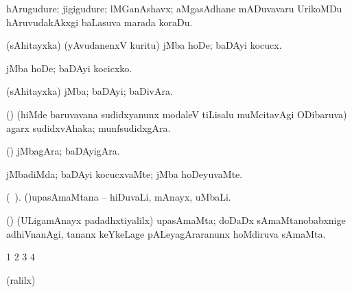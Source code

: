 \bentry
{} 
\gl{\nA}
\expl{}
\bmng
 hArugudure; jigigudure; lMGanAshavx; aMgasAdhane mADuvavaru UrikoMDu hAruvudakAkxgi baLasuva marada koraDu. 
\emng
\eentry

\bentry
{} 
\gl{\sakirx}
\expl{}
\bmng
 (sAhitayxka) (yAvudanenxV kuritu) jMba hoDe; baDAyi kocucx. 
\emng

\noindent 
\gl{\akirx}
\expl{}
\bmng
 jMba hoDe; baDAyi kocicxko. 
\emng
\eentry

\bentry
{} 
\gl{\nA}
\expl{}
\bmng
 (sAhitayxka) jMba; baDAyi; baDivAra. 
\emng
\eentry

\bentry
{} 
\gl{\nA}
\expl{}
\bmng
(\pArxparx) (hiMde baruvavana sudidxyanunx modaleV tiLisalu muMcitavAgi ODibaruva) agarx sudidxvAhaka; munfsudidxgAra. 
\emng
\eentry

\bentry
{} 
\gl{\nA}
\expl{}
\bmng
(\pArxparx) jMbagAra; baDAyigAra. 
\emng
\eentry

\bentry
{} 
\gl{\kirxvi}
\expl{}
\bmng
 jMbadiMda; baDAyi kocucxvaMte; jMba hoDeyuvaMte. 
\emng
\eentry

\bentry
{} 
\gl{\nA}(\bava\ ). 
\bmng
 (\ca)upasAmaMtana -- hiDuvaLi, mAnayx, uMbaLi. 
\emng
\eentry

\bentry
{} 
\gl{\nA}
\expl{}
(\ca) \bmng
 (ULigamAnayx padadhxtiyalilx) upasAmaMta; doDaDx sAmaMtanobabxnige adhiVnanAgi, tananx keYkeLage pALeyagAraranunx hoMdiruva sAmaMta. 
\emng
\eentry

\bentry 
{}
\gl{\saMkiSx}
\expl{}
\bmng
\bnum
\num{1}  
\num{2}  
\num{3}  
\num{4}  
\enum
\emng
\eentry

\bentry
{}
\gl{\saMkiSx}
\expl{}
\bmng
\emng
\eentry

\bentry
{}
\gl{\saMkiSx}
\expl{}
\bmng
{} 
\emng
\eentry

\bentry
{}
\gl{\saMkiSx}
\expl{}
\bmng
\emng
\eentry

\bentry
{}
\gl{\saMkiSx}
\expl{}
\bmng
(ralilx)  
\emng
\eentry


